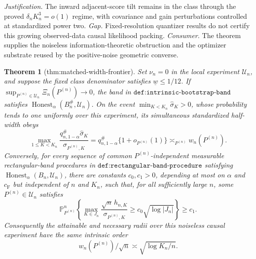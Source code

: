 \documentclass{article}
\newtheorem{theorem}{Theorem}
\begin{document}
\par\smallskip\noindent \textit{Justification.} The inward adjacent-score tilt remains in the class through the proved \(\delta_nK_n^3=o(1)\) regime, with covariance and gain perturbations controlled at standardized power two. \textit{Gap.} Fixed-resolution quantizer results do not certify this growing observed-data causal likelihood packing. \textit{Consumer.} The theorem supplies the noiseless information-theoretic obstruction and the optimizer substrate reused by the positive-noise geometric converse.

\begin{theorem}[thm:matched-width-frontier]\label{thm:matched-width-frontier}
Set \(\nu_n=0\) in the local experiment \(\mathcal U_n\), and suppose the fixed class denominator satisfies \(\underline w\leq1/12\).  If \(\sup_{P^{(n)}\in\mathcal U_n}\Xi_n(P^{(n)})\to0\), the band in \(\texttt{def:intrinsic-bootstrap-band}\) satisfies \(\operatorname{Honest}_{\alpha}(B_n^{\#},\mathcal U_n)\).  On the event \(\min_{K<K_n}\widehat\sigma_K>0\), whose probability tends to one uniformly over this experiment, its simultaneous standardized half-width obeys
\[
 \max_{1\leq K<K_n}\frac{q_{n,1-\alpha}^{\#}\widehat\sigma_K}{\sigma_{P^{(n)},K}}
 =q_{n,1-\alpha}^{\#}\{1+o_{P^{(n)}}(1)\}
 \asymp_{P^{(n)}}w_n(P^{(n)}).
\]
Conversely, for every sequence of common \(P^{(n)}\)-independent measurable rectangular-band procedures in \(\texttt{def:rectangular-band-procedure}\) satisfying \(\operatorname{Honest}_{\alpha}(B_n,\mathcal U_n)\), there are constants \(c_0,c_1>0\), depending at most on \(\alpha\) and \(c_{\mathrm F}\) but independent of \(n\) and \(K_n\), such that, for all sufficiently large \(n\), some \(P^{(n)}\in\mathcal U_n\) satisfies
\[
 \mathbb P_{P^{(n)}}^n\left\{\max_{K\in J_n}\frac{\sqrt n\,h_{n,K}}{\sigma_{P^{(n)},K}}
 \geq c_0\sqrt{\log|J_n|}\right\}\geq c_1.
\]
Consequently the attainable and necessary radii over this noiseless causal experiment have the same intrinsic order
\[
 w_n(P^{(n)})/\sqrt n\asymp\sqrt{\log K_n/n}.
\]
\end{theorem}
\end{document}
